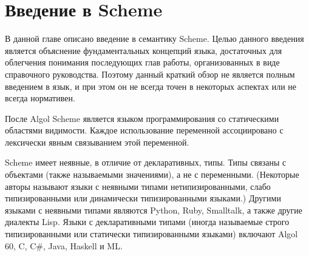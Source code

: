 \chapter{Введение в Scheme}
\label{semanticchapter}

В данной главе описано введение в семантику Scheme. Целью данного введения является объяснение
фундаментальных концепций языка, достаточных для облегчения понимания последующих глав работы,
организованных в виде справочного руководства. Поэтому данный краткий обзор не является полным
введением в язык, и при этом он не всегда точен в некоторых аспектах или не всегда нормативен.

После Algol Scheme является языком программирования со статическими областями
видимости. Каждое использование переменной ассоциировано с лексически явным
связыванием этой переменной.

\vest Scheme имеет неявные, в отличие от декларативных, типы\cite{WaiteGoos}. Типы связаны с
объектами (также называемыми значениями), а не с переменными. (Некоторые
авторы называют языки с неявными типами нетипизированными, слабо типизированными или динамически
типизированными языками.) Другими языками с неявными типами являются Python, Ruby, Smalltalk, а
также другие диалекты Lisp. Языки с декларативными типами (иногда называемые строго
типизированными или статически типизированными языками) включают Algol 60, C, C\#, Java, Haskell
и ML.

